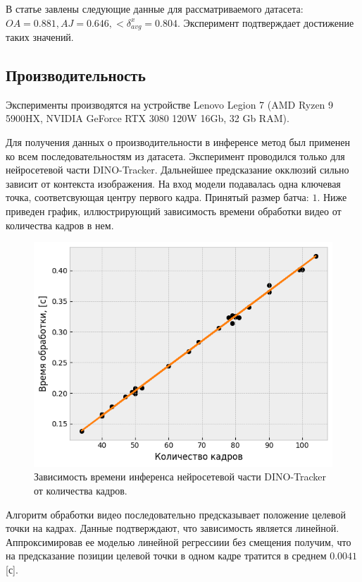 \documentclass[a4paper, 14pt]{extarticle}
\theoremstyle{definition}
\theoremstyle{plain}
\theoremstyle{remark}
\begin{document}
В статье завлены следующие данные для рассматриваемого датасета:
$OA=0.881, AJ=0.646, <\delta^x_{avg}=0.804$. Эксперимент подтверждает достижение таких значений.
	
\subsection{Производительность}
Эксперименты производятся на устройстве Lenovo Legion 7 (AMD Ryzen 9 5900HX, NVIDIA GeForce RTX 3080 120W 16Gb, 32 Gb RAM).

Для получения данных о производительности в инференсе метод был применен ко всем последовательностям из датасета. Эксперимент проводился только для нейросетевой части DINO-Tracker. Дальнейшее предсказание окклюзий сильно зависит от контекста изображения.
На вход модели подавалась одна ключевая точка, соответсвующая центру первого кадра. Принятый размер батча: $1$.
Ниже приведен график, иллюстрирующий зависимость времени обработки видео от количества кадров в нем. 
\begin{figure}
    [H]
    \centering
    \includegraphics[width=\textwidth]{figs/performance.png}
    \caption{Зависимость времени инференса нейросетевой части DINO-Tracker от количества кадров.}
    \label{fig:performance}
\end{figure}

Алгоритм обработки видео последовательно предсказывает положение целевой точки на кадрах. Данные подтверждают, что зависимость является линейной. Аппроксимировав ее моделью линейной регрессиии без смещения получим, что на предсказание позиции целевой точки в одном кадре тратится в среднем $0.0041$ [с].
\end{document}
